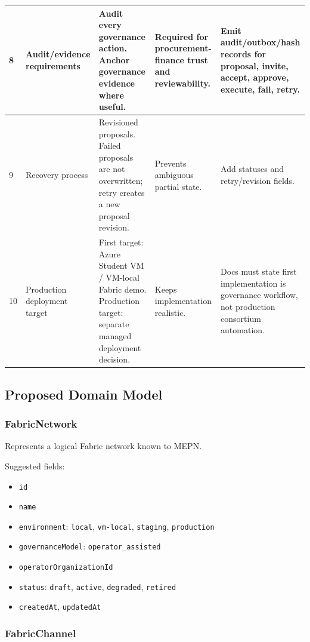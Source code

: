 \begin{longtable}{p{}p{}p{}p{}p{}}
\hline
8 & Audit/evidence requirements & Audit every governance action. Anchor governance evidence where useful. & Required for procurement-finance trust and reviewability. & Emit audit/outbox/hash records for proposal, invite, accept, approve, execute, fail, retry. \\
\hline
9 & Recovery process & Revisioned proposals. Failed proposals are not overwritten; retry creates a new proposal revision. & Prevents ambiguous partial state. & Add statuses and retry/revision fields. \\
\hline
10 & Production deployment target & First target: Azure Student VM / VM-local Fabric demo. Production target: separate managed deployment decision. & Keeps implementation realistic. & Docs must state first implementation is governance workflow, not production consortium automation. \\
\hline
\end{longtable}

\subsection{Proposed Domain Model}

\subsubsection{FabricNetwork}

Represents a logical Fabric network known to MEPN.

Suggested fields:

\begin{itemize}
  \item \texttt{id}
  \item \texttt{name}
  \item \texttt{environment}: \texttt{local}, \texttt{vm-local}, \texttt{staging}, \texttt{production}
  \item \texttt{governanceModel}: \texttt{operator\_assisted}
  \item \texttt{operatorOrganizationId}
  \item \texttt{status}: \texttt{draft}, \texttt{active}, \texttt{degraded}, \texttt{retired}
  \item \texttt{createdAt}, \texttt{updatedAt}
\end{itemize}

\subsubsection{FabricChannel}

